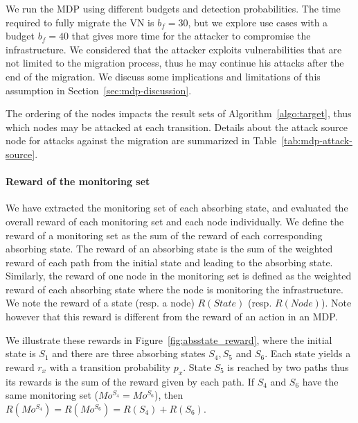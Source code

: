 

We run the MDP using different budgets and detection probabilities.
The time required to fully migrate the VN is $b_f=30$, but we explore use cases with a budget $b_f=40$ that gives more time for the attacker to compromise the infrastructure. We considered that the attacker exploits vulnerabilities that are not limited to the migration process, thus he may continue his attacks after the end of the migration. We discuss some implications and limitations of this assumption in Section~\ref{sec:mdp-discussion}.

The ordering of the nodes impacts the result sets of Algorithm~\ref{algo:target}, thus which nodes may be attacked at each transition.
Details about the attack source node for attacks against the migration are summarized in Table~\ref{tab:mdp-attack-source}. 



\paragraph{Reward of the monitoring set}
We have extracted the monitoring set of each absorbing state, and evaluated the overall reward of each monitoring set and each node individually.
We define the reward of a monitoring set as the sum of the reward of each corresponding absorbing state.
The reward of an absorbing state is the sum of the weighted reward of each path from the initial state and leading to the absorbing state. Similarly, the reward of one node in the monitoring set is defined as the weighted reward of each absorbing state where the node is monitoring the infrastructure.
We note the reward of a state (resp. a node) $R(State)$ (resp. $R(Node)$). Note however that this reward is different from the reward of an action in an MDP.

We illustrate these rewards in Figure~\ref{fig:absstate_reward}, where the initial state is $S_1$ and there are three absorbing states $S_4,S_5$ and $S_6$. Each state yields a reward $r_x$ with a transition probability $p_x$.
State $S_5$ is reached by two paths thus its rewards is the sum of the reward given by each path.
If $S_4$ and $S_6$ have the same monitoring set (\ie $Mo^{S_4} = Mo^{S_6}$), then $R(Mo^{S_4}) = R(Mo^{S_6}) = R(S_4) + R(S_6)$.


